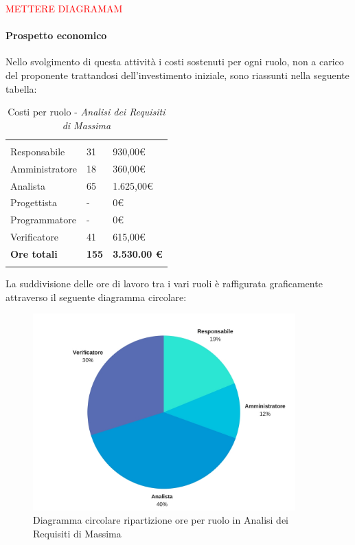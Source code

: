 			\textcolor{red}{METTERE DIAGRAMAM}		
			
			\paragraph{Prospetto economico} \Spazio
			Nello svolgimento di questa attività i costi sostenuti per ogni ruolo, non a carico del proponente trattandosi dell'investimento iniziale, sono riassunti nella seguente tabella:
			\begin{table}[H]
				\centering
				\begin{tabular}{|p{4cm}|C{4cm}|C{4cm}|}
					
					 & &\\
					
					Responsabile & 31 & 930,00\euro \\
					\hline
					Amministratore& 18 & 360,00\euro \\
					\hline
					Analista & 65 & 1.625,00\euro \\
					\hline
					Progettista & - & 0\euro \\
					\hline
					Programmatore & - & 0\euro \\
					\hline
					Verificatore & 41 & 615,00\euro \\
					\hline				
					\textbf{Ore totali} & \textbf{155} & \textbf{3.530.00 \euro} \\
				\end{tabular}
				\caption{Costi per ruolo - \textit{Analisi dei Requisiti di Massima}}
			\end{table}

			
			La suddivisione delle ore di lavoro tra i vari ruoli è raffigurata graficamente attraverso il seguente diagramma circolare:
			\begin{figure}[h] 
			\centering 
				\includegraphics[width=0.9\textwidth]{images/CircolareAnalisiRequisitiDiMassima.jpg} 
				\caption{Diagramma circolare ripartizione ore per ruolo in Analisi dei Requisiti di Massima}
			\label{CircolareAnalisiRequisitiDiMassima}
			\end{figure}

